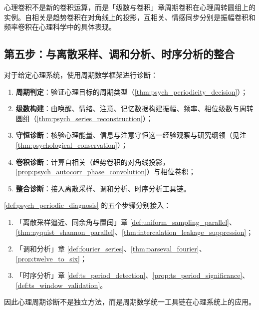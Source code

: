 \begin{remark}[心理卷积与周期卷积的关系]\label{rem:psych_convolution_relation}
心理卷积不是新的卷积运算，而是「级数与卷积」章周期卷积在心理周转圆组上的实例。自相关是趋势卷积在对角线上的投影，互相关、情感同步分别是振幅卷积和频率卷积在心理科学中的具体表现。
\end{remark}

\subsection{第五步：与离散采样、调和分析、时序分析的整合}

\begin{definition}[心理周期诊断流程]\label{def:psych_periodic_diagnosis}
对于给定心理系统，使用周期数学框架进行诊断：
\begin{enumerate}[label=(\roman*)]
    \item \textbf{周期判定}：验证心理目标的周期类型（\cref{thm:psych_periodicity_decision}）；
    \item \textbf{级数构建}：由唤醒、情绪、注意、记忆数据构建振幅、频率、相位级数与周转圆组（\cref{thm:psych_series_reconstruction}）；
    \item \textbf{守恒诊断}：核验心理能量、信息与注意守恒这一经验观察与研究纲领（见注 \cref{thm:psychological_conservation}）；
    \item \textbf{卷积诊断}：计算自相关（趋势卷积的对角线投影，\cref{prop:psych_autocorr_phase_convolution}）与相位卷积；
    \item \textbf{整合诊断}：接入离散采样、调和分析、时序分析工具链。
\end{enumerate}
\end{definition}

\begin{theorem}[心理周期诊断流程与三章接口]\label{thm:psych_diagnosis_integration}
\cref{def:psych_periodic_diagnosis} 的五个步骤分别接入：
\begin{enumerate}[label=(\roman*)]
    \item 「离散采样逼近、同余角与置闰」章 \cref{def:uniform_sampling_parallel}、\cref{thm:nyquist_shannon_parallel}、\cref{thm:intercalation_leakage_suppression}；
    \item 「调和分析」章 \cref{def:fourier_series}、\cref{thm:parseval_fourier}、\cref{prop:twelve_to_six}；
    \item 「时序分析」章 \cref{def:ts_period_detection}、\cref{prop:ts_period_significance}、\cref{def:ts_window_validation}。
\end{enumerate}
因此心理周期诊断不是独立方法，而是周期数学统一工具链在心理系统上的应用。
\end{theorem}

